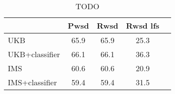 \begin{table}[!h]\begin{tabular}{l c c c c}
\toprule
                &   \textbf{Pwsd} &   \textbf{Rwsd} &   \textbf{Rwsd lfs} \\
\midrule
 UKB            &            65.9 &            65.9 &                25.3 \\
 UKB+classifier &            66.1 &            66.1 &                36.3 \\
 IMS            &            60.6 &            60.6 &                20.9 \\
 IMS+classifier &            59.4 &            59.4 &                31.5 \\
\bottomrule
\end{tabular}
\caption{TODO}
\end{table}
